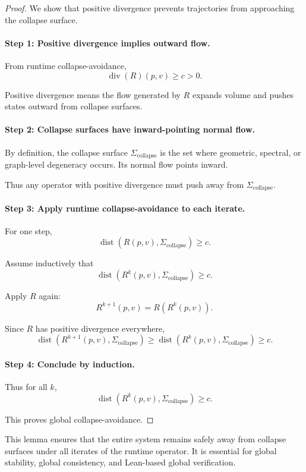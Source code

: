 \begin{proof}
We show that positive divergence prevents trajectories from approaching
the collapse surface.

\paragraph{Step 1: Positive divergence implies outward flow.}
From runtime collapse-avoidance,
\[
\operatorname{div}(R)(p,v) \ge c > 0.
\]

Positive divergence means the flow generated by $R$ expands volume and
pushes states outward from collapse surfaces.

\paragraph{Step 2: Collapse surfaces have inward-pointing normal flow.}
By definition, the collapse surface $\Sigma_{\mathrm{collapse}}$ is the
set where geometric, spectral, or graph-level degeneracy occurs.  
Its normal flow points inward.

Thus any operator with positive divergence must push away from
$\Sigma_{\mathrm{collapse}}$.

\paragraph{Step 3: Apply runtime collapse-avoidance to each iterate.}
For one step,
\[
\operatorname{dist}(R(p,v), \Sigma_{\mathrm{collapse}}) \ge c.
\]

Assume inductively that
\[
\operatorname{dist}(R^k(p,v), \Sigma_{\mathrm{collapse}}) \ge c.
\]

Apply $R$ again:
\[
R^{k+1}(p,v) = R(R^k(p,v)).
\]

Since $R$ has positive divergence everywhere,
\[
\operatorname{dist}(R^{k+1}(p,v), \Sigma_{\mathrm{collapse}})
\ge
\operatorname{dist}(R^k(p,v), \Sigma_{\mathrm{collapse}}) \ge c.
\]

\paragraph{Step 4: Conclude by induction.}
Thus for all $k$,
\[
\operatorname{dist}(R^k(p,v), \Sigma_{\mathrm{collapse}}) \ge c.
\]

This proves global collapse-avoidance.
\end{proof}

\begin{remark}
This lemma ensures that the entire system remains safely away from
collapse surfaces under all iterates of the runtime operator.  
It is essential for global stability, global consistency, and Lean-based
global verification.
\end{remark}



